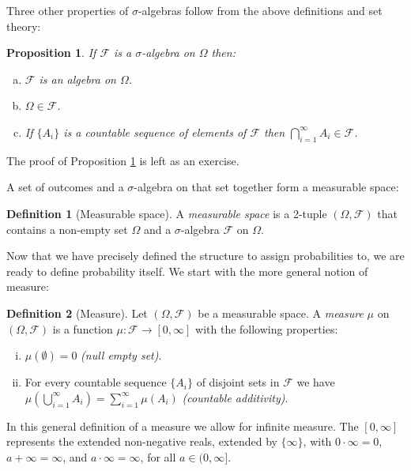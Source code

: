 \documentclass{book}
\theoremstyle{plain}%
\newtheorem{proposition}{Proposition}[section]
\theoremstyle{definition}
\newtheorem{definition}{Definition}[section]
\newlength{\arrow}
\begin{document}
Three other properties of $\sigma$-algebras follow from the above definitions and set theory:

\begin{proposition}
If $\mathcal{F}$ is a $\sigma$-algebra on $\Omega$ then:
\begin{enumerate}[(a)]
\item $\mathcal{F}$ is an algebra on $\Omega$.
\item  $\Omega \in \mathcal{F}$.
\item If $\{A_i\}$ is a countable sequence of elements of $\mathcal{F}$ then $\bigcap_{i=1}^\infty A_i \in \mathcal{F}$.
\end{enumerate}\label{prop:001}
\end{proposition}

The proof of Proposition \ref{prop:001} is left as an exercise.

A set of outcomes and a $\sigma$-algebra on that set together form a measurable space:

\begin{definition}[Measurable space]
A \emph{measurable space} is a 2-tuple $(\Omega, \mathcal{F})$ that contains a non-empty set $\Omega$ and a $\sigma$-algebra $\mathcal{F}$ on $\Omega$.
\end{definition}

Now that we have precisely defined the structure to assign probabilities to, we are ready to define probability itself. We start with the more general notion of measure:

\begin{definition}[Measure]
Let $(\Omega, \mathcal{F})$  be a measurable space. A \emph{measure} $\mu$ on $(\Omega, \mathcal{F})$ is a function $\mu: \mathcal{F} \rightarrow [0, \infty]$ with the following properties:
\begin{enumerate}[(i)]
\item $\mu(\emptyset) = 0$ \emph{(null empty set)}.
\item For every countable sequence $\{A_i\}$ of disjoint sets in $\mathcal{F}$ we have $\mu(\bigcup_{i=1}^\infty A_i) = \sum_{i=1}^\infty \mu(A_i)$ \emph{(countable additivity)}.
\end{enumerate}
\end{definition}

In this general definition of a measure we allow for infinite measure. The $[0, \infty]$ represents the extended non-negative reals, extended by $\{\infty\}$, with $0 \cdot \infty = 0$, $a + \infty = \infty$, and $a \cdot \infty = \infty$, for all $a \in (0, \infty]$.
\end{document}
